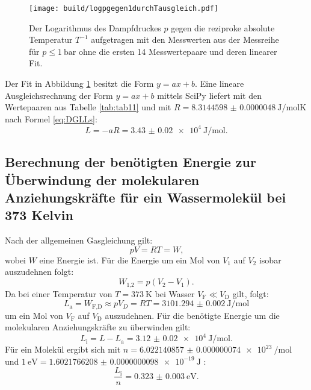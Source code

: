 \begin{figure}
	\centering
	\caption{Der Logarithmus des Dampfdruckes $p$ gegen die reziproke absolute Temperatur $T^{-1}$ aufgetragen mit den Messwerten aus der Messreihe für $p\leq \SI{1}{\bar}$ ohne die ersten 14 Messwertepaare und deren linearer Fit.}
	\texttt{[image: build/logpgegen1durchTausgleich.pdf]}
	\label{fig:Graph2}
\end{figure}
Der Fit in Abbildung \ref{fig:Graph2} besitzt die Form $y=a x + b$. Eine lineare Ausgleichsrechnung der Form $y=a x + b$ mittels SciPy \cite{scipy} liefert mit den Wertepaaren aus Tabelle \ref{tab:tab11} und mit $R=\SI{8.3144598(48)}{\joule\per\mol\kelvin}$ \cite{R} nach Formel \eqref{eq:DGLLs}:
\begin{displaymath}
L = -a R = \SI{3.43(2)e4}{\joule\per\mol}\text{.}
\end{displaymath}

\subsection{Berechnung der benötigten Energie zur Überwindung der molekularen Anziehungskräfte für ein Wassermolekül bei 373 Kelvin}
Nach der allgemeinen Gasgleichung gilt:
\begin{equation}
p V = R T = W \text{,}\label{eq:Gas}
\end{equation}
wobei $W$ eine Energie ist.
Für die Energie um ein Mol von $V_1$ auf $V_2$ isobar auszudehnen folgt:
\begin{equation}
W_\text{1,2} = p (V_2-V_1)\text{.}
\end{equation}
Da bei einer Temperatur von $T=\SI{373}{\kelvin}$ bei Wasser $V_\text{F}\ll V_\text{D}$ gilt, folgt:
\begin{equation}
	L_\text{a} = W_\text{F,D} \approx p V_D = R T = \SI{3101.294(2)}{\joule\per\mol}
\end{equation} 
um ein Mol von $V_\text{F}$ auf $V_\text{D}$ auszudehnen.
Für die benötigte Energie um die molekularen Anziehungskräfte zu überwinden gilt:
\begin{equation}
	L_\text{i}= L - L_\text{a} = \SI{3.12(2)e4}{\joule\per\mol}\text{.}
\end{equation}
Für ein Molekül ergibt sich mit $n=\SI{6.022140857(74)e23}{\per\mol}$ \cite{n} und $\SI{1}{\electronvolt}=\SI{1.6021766208(98)e-19}{\joule}$ \cite{eV}:
\begin{equation}
	\frac{L_\text{i}}{n} = \SI{0.323(3)}{\electronvolt}\text{.}
\end{equation}

